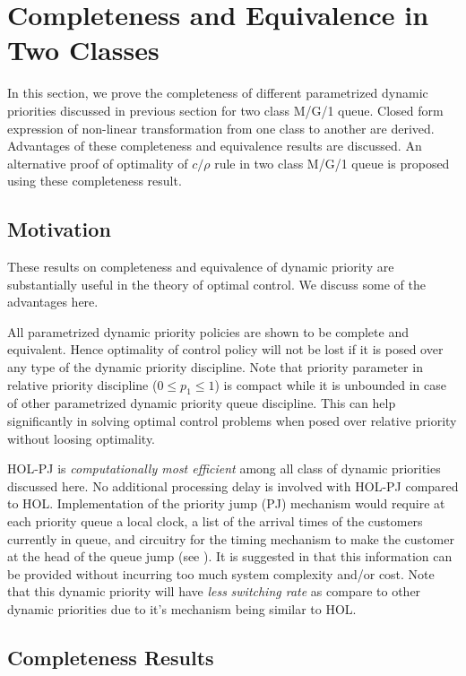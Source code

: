 \documentclass[a4paper,12pt]{article}
\begin{document}
\section{Completeness and Equivalence in Two Classes}
\label{sec:completeness_proofs}
In this section, we prove the completeness of different parametrized dynamic priorities discussed in previous section for two class M/G/1 queue. Closed form expression of non-linear transformation from one class to another are derived. Advantages of these completeness and equivalence results are discussed. An alternative proof of optimality of $c/\rho$ rule in two class M/G/1 queue is proposed using these completeness result. 
\subsection{Motivation}
These results on completeness and equivalence of dynamic priority are substantially useful in the theory of optimal control. We discuss some of the advantages here. 

All parametrized dynamic priority policies are shown to be complete and equivalent. Hence optimality of control policy will not be lost if it is posed over any type of the dynamic priority discipline. Note that priority parameter in relative priority discipline ($0\le p_1 \le 1$) is compact while it is unbounded in case of other parametrized dynamic priority queue discipline. This can help significantly in solving optimal control problems when posed over relative priority without loosing optimality.

HOL-PJ is \textit{computationally most efficient} among all class of dynamic priorities discussed here. No additional processing delay is involved with HOL-PJ compared to HOL. Implementation of the priority jump (PJ) mechanism would require at each priority queue a local clock, a list of the arrival times of the customers currently in queue, and circuitry for the timing mechanism to make the customer at the head of the queue jump (see \cite{holpj}). It is suggested in \cite{holpj} that this information can be provided without incurring too much system complexity and/or cost. Note that this dynamic priority will have \textit{less} \textit{switching rate} as compare to other dynamic priorities due to it's mechanism being similar to HOL.

\subsection{Completeness Results} 
\end{document}
